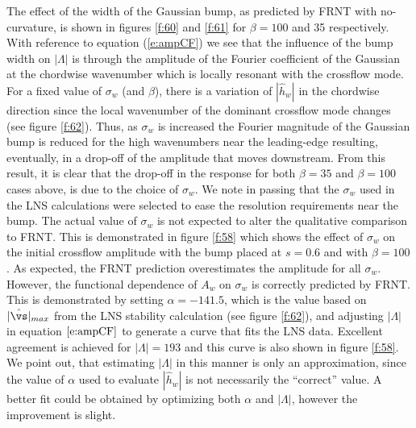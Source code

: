 The effect of the width of the Gaussian bump, as predicted by FRNT with
no-curvature, is shown in figures \ref{f:60} and \ref{f:61} for $\beta=100$
and 35 respectively.  With reference to equation (\ref{e:ampCF}) we see that
the influence of the bump width on $|\Lambda|$ is through the amplitude of the
Fourier coefficient of the Gaussian at the chordwise wavenumber which is
locally resonant with the crossflow mode.  For a fixed value of $\sigma_w$
(and $\beta$), there is a variation of $|\hat h_w|$ in the chordwise direction
since the local wavenumber of the dominant crossflow mode changes (see figure
\ref{f:62}).  Thus, as $\sigma_w$ is increased the Fourier magnitude of the
Gaussian bump is reduced for the high wavenumbers near the leading-edge
resulting, eventually, in a drop-off of the amplitude that moves downstream.
From this result, it is clear that the drop-off in the response for both
$\beta=35$ and $\beta=100$ cases above, is due to the choice of $\sigma_w$.
We note in passing that the $\sigma_w$ used in the LNS calculations were
selected to ease the resolution requirements near the bump.  The actual value
of $\sigma_w$ is not expected to alter the qualitative comparison to FRNT.
This is demonstrated in figure \ref{f:58} which shows the effect of $\sigma_w$
on the initial crossflow amplitude with the bump placed at $s=0.6$ and with
$\beta=100$.  As expected, the FRNT prediction overestimates the amplitude for
all $\sigma_w$.  However, the functional dependence of $A_w$ on $\sigma_w$ is
correctly predicted by FRNT.  This is demonstrated by setting $\alpha =
-141.5$, which is the value based on $|\hat\vs|_{max}$ from the LNS stability
calculation (see figure \ref{f:62}), and adjusting $|\Lambda|$ in equation
$\ref{e:ampCF}$ to generate a curve that fits the LNS data.  Excellent
agreement is achieved for $|\Lambda|=193$ and this curve is also shown in
figure \ref{f:58}.  We point out, that estimating $|\Lambda|$ in this manner
is only an approximation, since the value of $\alpha$ used to evaluate $|\hat
h_w|$ is not necessarily the ``correct'' value.  A better fit could be
obtained by optimizing both $\alpha$ and $|\Lambda|$, however the improvement
is slight.

